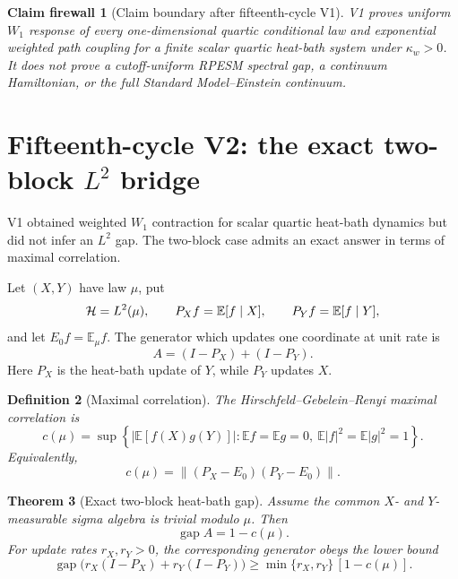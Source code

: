\documentclass[11pt]{article}
\newtheorem{theorem}{Theorem}[section]
\newtheorem{definition}[theorem]{Definition}
\newtheorem{firewall}[theorem]{Claim firewall}
\theoremstyle{remark}
\begin{document}
\begin{firewall}[Claim boundary after fifteenth-cycle V1]
\label{fire:v15v1}
V1 proves uniform \(W_1\) response of every one-dimensional
quartic conditional law and exponential weighted path coupling for
a finite scalar quartic heat-bath system under \(\kappa_w>0\).
It does not prove a cutoff-uniform RPESM spectral gap, a continuum
Hamiltonian, or the full Standard Model--Einstein continuum.
\end{firewall}


\section{Fifteenth-cycle V2: the exact two-block \(L^2\) bridge}
\label{sec:v15v2}

V1 obtained weighted \(W_1\) contraction for scalar quartic
heat-bath dynamics but did not infer an \(L^2\) gap.  The two-block
case admits an exact answer in terms of maximal correlation.

Let \((X,Y)\) have law \(\mu\), put
\[
 {\cal H}=L^2(\mu),\qquad
 P_Xf=\mathbb E[f\mid X],\qquad
 P_Yf=\mathbb E[f\mid Y],
\]
and let \(E_0f=\mathbb E_\mu f\).  The generator which updates one
coordinate at unit rate is
\[
 A=(I-P_X)+(I-P_Y).                                          \tag{2.1}
\]
Here \(P_X\) is the heat-bath update of \(Y\), while \(P_Y\)
updates \(X\).

\begin{definition}[Maximal correlation]
\label{def:v15v2-maxcorr}
The Hirschfeld--Gebelein--Renyi maximal correlation is
\[
 c(\mu)=
 \sup\left\{
 |\mathbb E[f(X)g(Y)]|:
 \mathbb Ef=\mathbb Eg=0,\ 
 \mathbb E|f|^2=\mathbb E|g|^2=1
 \right\}.                                                   \tag{2.2}
\]
Equivalently,
\[
 c(\mu)=
 \bigl\|(P_X-E_0)(P_Y-E_0)\bigr\|.                           \tag{2.3}
\]
\end{definition}

\begin{theorem}[Exact two-block heat-bath gap]
\label{thm:v15v2-two-projection}
Assume the common \(X\)- and \(Y\)-measurable sigma algebra is
trivial modulo \(\mu\).  Then
\[
 \boxed{\operatorname{gap}A=1-c(\mu).}                       \tag{2.4}
\]
For update rates \(r_X,r_Y>0\), the corresponding generator obeys
the lower bound
\[
 \operatorname{gap}\bigl(r_X(I-P_X)+r_Y(I-P_Y)\bigr)
 \ge\min\{r_X,r_Y\}\,[1-c(\mu)].                             \tag{2.5}
\]
\end{theorem}
\end{document}
